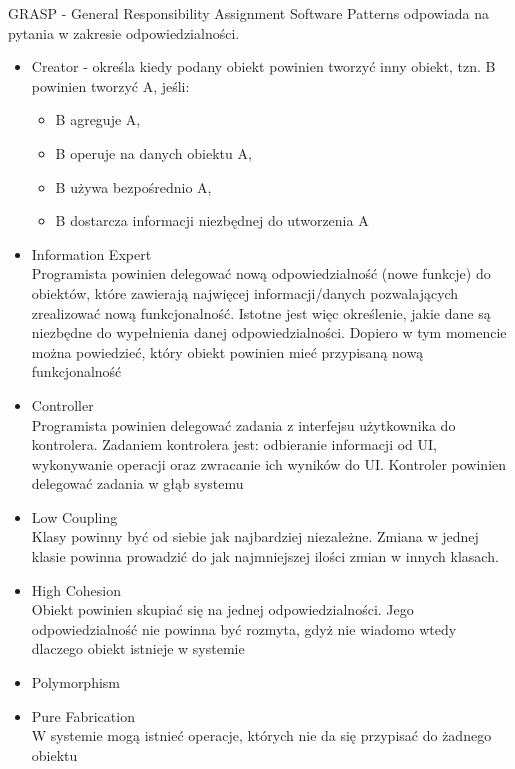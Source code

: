 \documentclass[a4paper]{article}
\begin{document}
    GRASP - General Responsibility Assignment Software Patterns odpowiada na pytania w zakresie odpowiedzialności.
    \begin{itemize}
        \item Creator - określa kiedy podany obiekt powinien tworzyć inny obiekt, tzn. B powinien tworzyć A, jeśli:
        \begin{itemize}
            \item B agreguje A,
            \item B operuje na danych obiektu A,
            \item B używa bezpośrednio A,
            \item B dostarcza informacji niezbędnej do utworzenia A
        \end{itemize}
        \item Information Expert\\
        Programista powinien delegować nową
        odpowiedzialność (nowe funkcje) do obiektów, które
        zawierają najwięcej informacji/danych
        pozwalających zrealizować nową funkcjonalność.
        Istotne jest więc określenie, jakie dane są niezbędne
        do wypełnienia danej odpowiedzialności. Dopiero w
        tym momencie można powiedzieć, który obiekt
        powinien mieć przypisaną nową funkcjonalność
        \item Controller\\
        Programista powinien delegować zadania z interfejsu
        użytkownika do kontrolera.
        Zadaniem kontrolera jest: odbieranie informacji od UI,
        wykonywanie operacji oraz zwracanie ich wyników
        do UI. Kontroler powinien delegować zadania w głąb
        systemu
        \item Low Coupling\\
        Klasy powinny być od siebie jak najbardziej
        niezależne. Zmiana w jednej klasie powinna
        prowadzić do jak najmniejszej ilości zmian w innych
        klasach.
        \item High Cohesion\\
        Obiekt powinien skupiać się na jednej
        odpowiedzialności. Jego odpowiedzialność nie
        powinna być rozmyta, gdyż nie wiadomo
        wtedy dlaczego obiekt istnieje w systemie
        \item Polymorphism
        \item Pure Fabrication\\
        W systemie mogą istnieć operacje, których nie
        da się przypisać do żadnego obiektu

\end{itemize}
\end{document}
